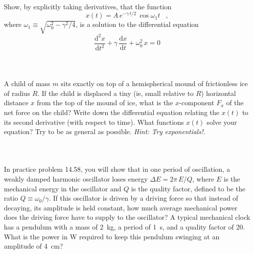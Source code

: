 \documentclass[12pt]{article}
\newcounter{problem}
\begin{document}
\paragraph{\problemname~\theproblem}

Show, by explicitly taking derivatives, that the function
\begin{equation}
x(t) = A\,e^{-\gamma\,t/2}\,\cos\omega_1 t \;\;\; ,
\end{equation}
where $\omega_1\equiv\sqrt{\omega_0^2-\gamma^2/4}$, is a solution
to the differential equation
\begin{equation}
\frac{\mathrm{d}^2x}{\mathrm{d}t^2}
 + \gamma\,\frac{\mathrm{d}x}{\mathrm{d}t}
 + \omega_0^2\,x = 0
\end{equation}

\paragraph{\problemname~\theproblem}

A child of mass $m$ sits exactly on top of a hemispherical mound of
frictionless ice of radius $R$.  If the child is displaced a tiny (ie,
small relative to $R$) horizontal distance $x$ from the top of the
mound of ice, what is the $x$-component $F_x$ of the net force on the
child?  Write down the differential equation relating the $x(t)$ to
its second derivative (with respect to time).  What functions $x(t)$
solve your equation?  Try to be as general as possible.  \emph{Hint:
Try exponentials!}.

\paragraph{\problemname~\theproblem}

In practice problem 14.58, you will show that in one period of
oscillation, a weakly damped harmonic oscillator loses energy $\Delta
E = 2\pi\,E/Q$, where $E$ is the mechanical energy in the oscillator
and $Q$ is the quality factor, defined to be the ratio
$Q\equiv\omega_0/\gamma$.  If this oscillator is driven by a driving
force so that instead of decaying, its amplitude is held constant, how
much average mechanical power does the driving force have to supply to
the oscillator?  A typical mechanical clock has a pendulum with a mass
of 2~kg, a period of 1~s, and a quality factor of 20.  What is the
power in W required to keep this pendulum swinging at an amplitude of
4~cm?
\end{document}
